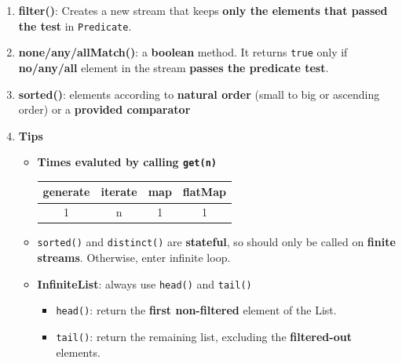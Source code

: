 \documentclass[10pt, landscape]{article}
\begin{document}
\begin{multicols}{4}
\begin{enumerate}
    \item \textbf{filter()}: Creates a new stream that keeps \textbf{only the elements that passed the test} in \texttt{Predicate}.
    \item \textbf{none/any/allMatch()}: a \textbf{boolean} method. It returns \texttt{true} only if \textbf{no/any/all} element in the stream \textbf{passes the predicate test}.
    \item \textbf{sorted()}: elements according to \textbf{natural order} (small to big or ascending order) or a \textbf{provided comparator}
    \item \textbf{Tips}
    \begin{itemize}
        \item \textbf{Times evaluted by calling \texttt{get(n)}} \\
        \begin{tabular}{|c|c|c|c|}
        \hline
        \textbf{generate} & \textbf{iterate} & \textbf{map} & \textbf{flatMap} \\
        \hline
        1                 & n                & 1             & 1               \\
        \hline
        \end{tabular}
        \item \texttt{sorted()} and \texttt{distinct()} are \textbf{stateful}, so should only be called on \textbf{finite streams}. Otherwise, enter infinite loop.
        \item \textbf{InfiniteList}: always use \texttt{head()} and \texttt{tail()}
        \begin{itemize}
            \item \texttt{head()}: return the \textbf{first non-filtered} element of the List.
            \item \texttt{tail()}: return the remaining list, excluding the \textbf{filtered-out} elements.
        \end{itemize}
    \end{itemize}
\end{enumerate}


\end{multicols}
\end{document}
